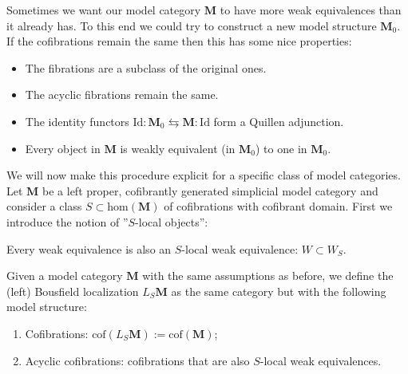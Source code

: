     Sometimes we want our model category $\mathbf{M}$ to have more weak equivalences than it already has. To this end we could try to construct a new model structure $\mathbf{M}_0$. If the cofibrations remain the same then this has some nice properties:
    \begin{itemize}
        \item The fibrations are a subclass of the original ones.
        \item The acyclic fibrations remain the same.
        \item The identity functors $\text{Id}:\mathbf{M}_0\leftrightarrows\mathbf{M}:\text{Id}$ form a Quillen adjunction.
        \item Every object in $\mathbf{M}$ is weakly equivalent (in $\mathbf{M}_0$) to one in $\mathbf{M}_0$.
    \end{itemize}
    We will now make this procedure explicit for a specific class of model categories. Let $\mathbf{M}$ be a left proper, cofibrantly generated simplicial model category and consider a class $S\subset\text{hom}(\mathbf{M})$ of cofibrations with cofibrant domain. First we introduce the notion of ''$S$-local objects'':
    \begin{property}
        Every weak equivalence is also an $S$-local weak equivalence: $W\subset W_S$.
    \end{property}
    \begin{construct}
        Given a model category $\mathbf{M}$ with the same assumptions as before, we define the (left) Bousfield localization $L_S\mathbf{M}$ as the same category but with the following model structure:
        \begin{enumerate}
            \item Cofibrations: $\text{cof}(L_S\mathbf{M}):=\text{cof}(\mathbf{M})$;
            \item Acyclic cofibrations: cofibrations that are also $S$-local weak equivalences.
        \end{enumerate}
    \end{construct}

